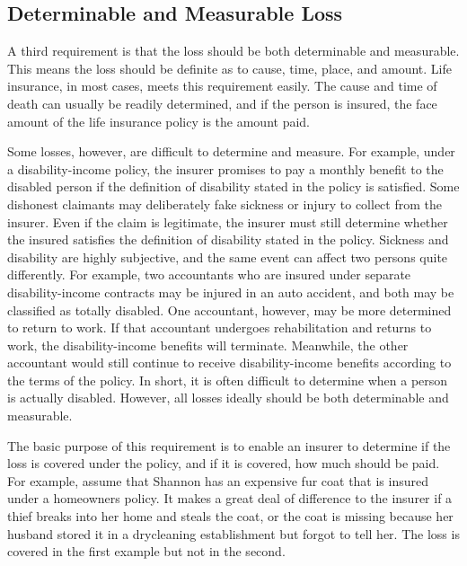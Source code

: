 \subsection{Determinable and Measurable Loss}
A third requirement is that the loss should be both determinable and measurable. This means the loss should be definite as to cause, time, place, and amount. Life insurance, in most cases, meets this requirement easily. The cause and time of death can usually be readily determined, and if the person is insured, the face amount of the life insurance policy is the amount paid.\\
\par
Some losses, however, are difficult to determine and measure. For example, under a disability-income policy, the insurer promises to pay a monthly benefit to the disabled person if the definition of disability stated in the policy is satisfied. Some dishonest claimants may deliberately fake sickness or injury to collect from the insurer. Even if the claim is legitimate, the insurer must still determine whether the insured satisfies the definition of disability stated in the policy. Sickness and disability are highly subjective, and the same event can affect two persons quite differently. For example, two accountants who are insured under separate disability-income contracts may be injured in an auto accident, and both may be classified as totally disabled. One accountant, however, may be more determined to return to work. If that accountant undergoes rehabilitation and returns to work, the disability-income benefits will terminate. Meanwhile, the other accountant would still continue to receive disability-income benefits according to the terms of the policy. In short, it is often difficult to determine when a person is actually disabled. However, all losses ideally should be both determinable and measurable.\\
\par
The basic purpose of this requirement is to enable an insurer to determine if the loss is covered under the policy, and if it is covered, how much should be paid. For example, assume that Shannon has an expensive fur coat that is insured under a homeowners policy. It makes a great deal of difference to the insurer if a thief breaks into her home and steals the coat, or the coat is missing because her husband stored it in a drycleaning establishment but forgot to tell her. The loss is covered in the first example but not in the second.
%

